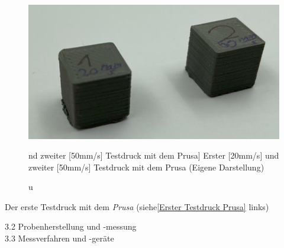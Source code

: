 \begin{figure}[h]
	\centering
	\includegraphics[width=\linewidth]{bilder/Erster Testdruck mit Prusa.png}
        \caption[Erster [20mm/s] und zweiter [50mm/s] Testdruck mit dem Prusa] {Erster [20mm/s] und zweiter [50mm/s] Testdruck mit dem Prusa (Eigene Darstellung)}
	\label{Erster Testdruck Prusa}
\end{figure}

Der erste Testdruck mit dem \textit{Prusa} (siehe\autoref{Erster Testdruck Prusa} links)

3.2 Probenherstellung und -messung\\
3.3 Messverfahren und -geräte\\